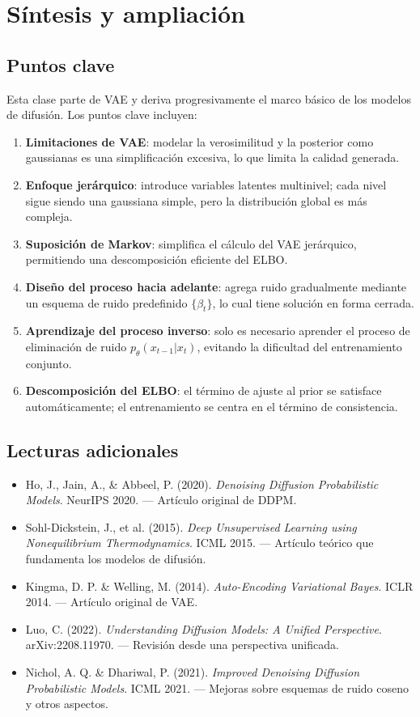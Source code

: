 \section{Síntesis y ampliación}

\subsection{Puntos clave}

Esta clase parte de VAE y deriva progresivamente el marco básico de los modelos de difusión. Los puntos clave incluyen:

\begin{enumerate}
    \item \textbf{Limitaciones de VAE}: modelar la verosimilitud y la posterior como gaussianas es una simplificación excesiva, lo que limita la calidad generada.
    \item \textbf{Enfoque jerárquico}: introduce variables latentes multinivel; cada nivel sigue siendo una gaussiana simple, pero la distribución global es más compleja.
    \item \textbf{Suposición de Markov}: simplifica el cálculo del VAE jerárquico, permitiendo una descomposición eficiente del ELBO.
    \item \textbf{Diseño del proceso hacia adelante}: agrega ruido gradualmente mediante un esquema de ruido predefinido $\{\beta_t\}$, lo cual tiene solución en forma cerrada.
    \item \textbf{Aprendizaje del proceso inverso}: solo es necesario aprender el proceso de eliminación de ruido $p_\theta(x_{t-1}|x_t)$, evitando la dificultad del entrenamiento conjunto.
    \item \textbf{Descomposición del ELBO}: el término de ajuste al prior se satisface automáticamente; el entrenamiento se centra en el término de consistencia.
\end{enumerate}

\subsection{Lecturas adicionales}

\begin{itemize}
    \item Ho, J., Jain, A., \& Abbeel, P. (2020). \textit{Denoising Diffusion Probabilistic Models}. NeurIPS 2020. --- Artículo original de DDPM.
    \item Sohl-Dickstein, J., et al. (2015). \textit{Deep Unsupervised Learning using Nonequilibrium Thermodynamics}. ICML 2015. --- Artículo teórico que fundamenta los modelos de difusión.
    \item Kingma, D. P. \& Welling, M. (2014). \textit{Auto-Encoding Variational Bayes}. ICLR 2014. --- Artículo original de VAE.
    \item Luo, C. (2022). \textit{Understanding Diffusion Models: A Unified Perspective}. arXiv:2208.11970. --- Revisión desde una perspectiva unificada.
    \item Nichol, A. Q. \& Dhariwal, P. (2021). \textit{Improved Denoising Diffusion Probabilistic Models}. ICML 2021. --- Mejoras sobre esquemas de ruido coseno y otros aspectos.
\end{itemize}



